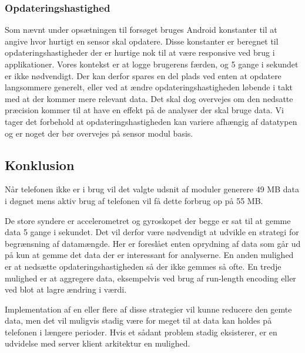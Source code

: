 \subsubsection{Opdateringshastighed}
Som nævnt under opsætningen til forsøget bruges Android konstanter til at angive hvor hurtigt en sensor skal opdatere.
Disse konstanter er beregnet til opdateringshastigheder der er hurtige nok til at være responsive ved brug i applikationer.
Vores kontekst er at logge brugerens færden, og 5 gange i sekundet er ikke nødvendigt.
Der kan derfor spares en del plads ved enten at opdatere langsommere generelt, eller ved at ændre opdateringshastigheden løbende i takt med at der kommer mere relevant data.
Det skal dog overvejes om den nedsatte præcision kommer til at have en effekt på de analyser der skal bruge data.
Vi tager det forbehold at opdateringshastigheden kan variere afhængig af datatypen og er noget der bør overvejes på sensor modul basis.

\subsection{Konklusion}
Når telefonen ikke er i brug vil det valgte udsnit af moduler generere 49 MB data i døgnet mens aktiv brug af telefonen vil få dette forbrug op på 55 MB.

De store syndere er accelerometret og gyroskopet der begge er sat til at gemme data 5 gange i sekundet.
Det vil derfor være nødvendigt at udvikle en strategi for begrænsning af datamængde.
Her er foreslået enten oprydning af data som går ud på kun at gemme det data der er interessant for analyserne.
En anden mulighed er at nedsætte opdateringshastigheden så der ikke gemmes så ofte.
En tredje mulighed er at aggregere data, eksempelvis ved brug af run-length encoding eller ved blot at lagre ændring i værdi.

Implementation af en eller flere af disse strategier vil kunne reducere den gemte data, men det vil muligvis stadig være for meget til at data kan holdes på telefonen i længere perioder.
Hvis et sådant problem stadig eksisterer, er en udvidelse med server klient arkitektur en mulighed.
